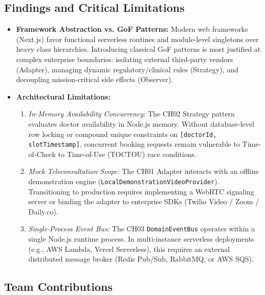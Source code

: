 \documentclass[11pt,a4paper]{article}
\begin{document}
\subsection{Findings and Critical Limitations}
\begin{itemize}
\item \textbf{Framework Abstraction vs. GoF Patterns:} Modern web frameworks (Next.js) favor functional serverless routines and module-level singletons over heavy class hierarchies. Introducing classical GoF patterns is most justified at complex enterprise boundaries: isolating external third-party vendors (Adapter), managing dynamic regulatory/clinical rules (Strategy), and decoupling mission-critical side effects (Observer).
\item \textbf{Architectural Limitations:}
  \begin{enumerate}
  \item \textit{In-Memory Availability Concurrency:} The CH02 Strategy pattern evaluates doctor availability in Node.js memory. Without database-level row locking or compound unique constraints on \texttt{[doctorId, slotTimestamp]}, concurrent booking requests remain vulnerable to Time-of-Check to Time-of-Use (TOCTOU) race conditions.
  \item \textit{Mock Teleconsultation Scope:} The CH01 Adapter interacts with an offline demonstration engine (\texttt{LocalDemonstrationVideoProvider}). Transitioning to production requires implementing a WebRTC signaling server or binding the adapter to enterprise SDKs (Twilio Video / Zoom / Daily.co).
  \item \textit{Single-Process Event Bus:} The CH03 \texttt{DomainEventBus} operates within a single Node.js runtime process. In multi-instance serverless deployments (e.g., AWS Lambda, Vercel Serverless), this requires an external distributed message broker (Redis Pub/Sub, RabbitMQ, or AWS SQS).
  \end{enumerate}
\end{itemize}

\subsection{Team Contributions}
\end{document}
